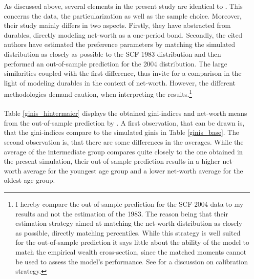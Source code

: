 \documentclass[a4paper,12pt,legno]{article}
\begin{document}
As discussed above, several elements in the present study are identical to \cite{hintermaier2011}. This concerns the data, the particularization as well as the sample choice. Moreover, their study mainly differs in two aspects. Firstly, they have abstracted from durables, directly modeling net-worth as a one-period bond. Secondly, the cited authors have estimated the preference parameters by matching the simulated distribution as closely as possible to the SCF 1983 distribution and then performed an out-of-sample prediction for the 2004 distribution. The large similarities coupled with the first difference, thus invite for a comparison in the light of modeling durables in the context of net-worth. However, the different methodologies demand caution, when interpreting the results.\footnote{I hereby compare the out-of-sample prediction for the SCF-2004 data to my results and not the estimation of the 1983. The reason being that their estimation strategy aimed at matching the net-worth distribution as closely as possible, directly matching percentiles. While this strategy is well suited for the out-of-sample prediction it says little about the ability of the model to match the empirical wealth cross-section, since the matched moments cannot be used to assess the model's performance. See \cite{kydland1996computational} for a discussion on calibration strategy.} \\
\\ Table \ref{ginis_hintermaier}
displays the obtained gini-indices and net-worth means from the out-of-sample prediction by \cite{hintermaier2011}. A first observation, that can be drawn is, that the gini-indices compare to the simulated ginis in Table \ref{ginis_base}. The second observation is, that there are some differences in the averages. While the average of the intermediate group compares quite closely to the one obtained in the present simulation, their out-of-sample prediction results in a higher net-worth average for the youngest age group and a lower net-worth average for the oldest age group.\\ 
\end{document}
